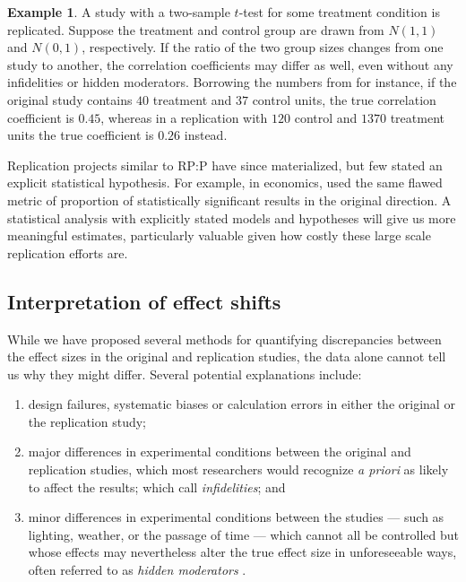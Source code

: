 \documentclass[aoas, preprint]{imsart}
\theoremstyle{definition}
\newtheorem{example}{Example}
\theoremstyle{custom}
\begin{document}
  \begin{example}
  \label{eg:unbal-t}
    A study with a two-sample $t$-test for some treatment condition is replicated. Suppose the treatment and control group are drawn from $N(1, 1)$ and $N(0, 1)$, respectively. If the ratio of the two group sizes changes from one study to another, the correlation coefficients may differ as well, even without any infidelities or hidden moderators. Borrowing the numbers from \citet{PurdieVaughns:2008en} for instance, if the original study contains $40$ treatment and $37$ control units, the true correlation coefficient is $0.45$, whereas in a replication with $120$ control and $1370$ treatment units the true coefficient is $0.26$ instead.
  \end{example}

  Replication projects similar to RP:P have since materialized, but few stated an explicit statistical hypothesis. For example, in economics, \citet{Camerer:2016cx} used the same flawed metric of proportion of statistically significant results in the original direction. A statistical analysis with explicitly stated models and hypotheses will give us more meaningful estimates, particularly valuable given how costly these large scale replication efforts are.


\subsection{Interpretation of effect shifts}

  While we have proposed several methods for quantifying discrepancies between the effect sizes in the original and replication studies, the data alone cannot tell us why they might differ. Several potential explanations include:
  \begin{enumerate}
  \item design failures, systematic biases or calculation errors in either the original or the replication study;
  \item major differences in experimental conditions between the original and replication studies, which most researchers would recognize {\em a priori} as likely to affect the results; which \citet{Gilbert:2016he} call {\em infidelities}; and
  \item minor differences in experimental conditions between the studies --- such as lighting, weather, or the passage of time --- which cannot all be controlled but whose effects may nevertheless alter the true effect size in unforeseeable ways, often referred to as {\em hidden moderators} \citep[e.g.][]{Srivastava:2015}.
  \end{enumerate}
\end{document}

